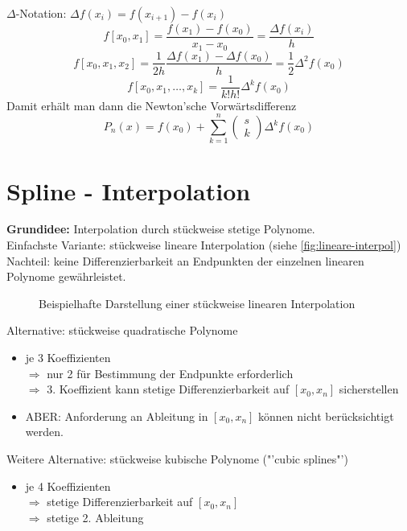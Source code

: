 $\Delta$-Notation: $\Delta f(x_i) = f(x_{i + 1}) - f(x_i)$
\begin{equation}
	f[x_0, x_1] = \frac{f(x_1) - f(x_0)}{x_1 - x_0} = \frac{\Delta f(x_i)}{h}
\end{equation}
\begin{equation}
	f[x_0, x_1, x_2] = \frac{1}{2h} \frac{\Delta f(x_1) - \Delta f(x_0)}{h} = \frac{1}{2} \Delta^2 f(x_0)
\end{equation}
\begin{equation}
	f[x_0, x_1, \ldots, x_k] = \frac{1}{k! h!} \Delta^k f(x_0)
\end{equation}
Damit erhält man dann die Newton'sche Vorwärtsdifferenz
\begin{equation}
	P_n(x) = f(x_0) + \sum_{k = 1}^n \begin{pmatrix} s \\ k \end{pmatrix} \Delta^k f(x_0)
\end{equation}

\section{Spline - Interpolation}
\textbf{Grundidee:} Interpolation durch stückweise stetige Polynome.\\
Einfachste Variante: stückweise lineare Interpolation (siehe \autoref{fig:lineare-interpol})\\
Nachteil: keine Differenzierbarkeit an Endpunkten der einzelnen linearen Polynome gewährleistet.\\
\begin{figure}[htbp]
	\begin{center}
		
	\end{center}
	\caption{Beispielhafte Darstellung einer stückweise linearen Interpolation}
	\label{fig:lineare-interpol}
\end{figure}

Alternative: stückweise quadratische Polynome
\begin{itemize}
	\item je 3 Koeffizienten\\
	$\Rightarrow$ nur 2 für Bestimmung der Endpunkte erforderlich\\
	$\Rightarrow$ 3. Koeffizient kann stetige Differenzierbarkeit auf $[x_0,x_n]$ sicherstellen\\
	\item ABER: Anforderung an Ableitung in $[x_0,x_n]$ können nicht berücksichtigt werden.
\end{itemize}
Weitere Alternative: stückweise kubische Polynome ("'cubic splines"')
\begin{itemize}
	\item je 4 Koeffizienten\\
	$\Rightarrow$ stetige Differenzierbarkeit auf $[x_0,x_n]$ \\
	$\Rightarrow$ stetige 2. Ableitung
\end{itemize}

